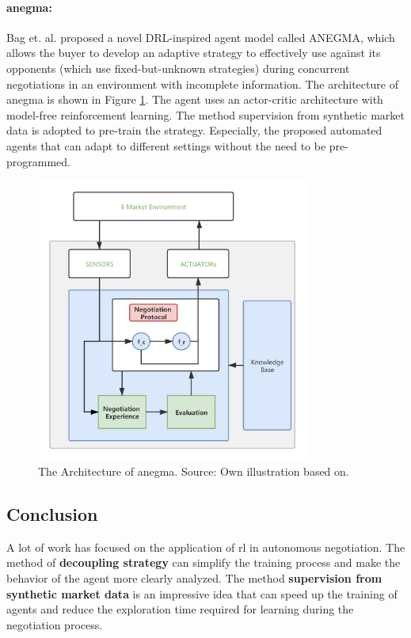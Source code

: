 \paragraph{\gls{anegma}\parencite{bagga2020deep}:} Bag et. al. proposed a novel DRL-inspired agent model called ANEGMA, which allows the buyer to develop an adaptive strategy to effectively use against its opponents (which use fixed-but-unknown strategies) during concurrent negotiations in an environment with incomplete information. The architecture of \gls{anegma} is shown in Figure \ref{fig:anegma}. The agent uses an actor-critic architecture with model-free reinforcement learning. The method supervision from synthetic market data is adopted to pre-train the strategy. Especially, the proposed automated agents that can adapt to different settings without the need to be pre-programmed.

\begin{figure}[htbp]
\centering
\includegraphics[width=0.8\textwidth]{./images/anegma.png}
\caption{The Architecture of \gls{anegma}. Source: Own illustration based on\parencite{bagga2020deep}.}
\label{fig:anegma}
\end{figure}

\subsection{Conclusion}
A lot of work has focused on the application of \gls{rl} in autonomous negotiation. The method of \textbf{decoupling strategy} can simplify the training process and make the behavior of the agent more clearly analyzed. The method \textbf{supervision from synthetic market data} is an impressive idea that can speed up the training of agents and reduce the exploration time required for learning during the negotiation process.

